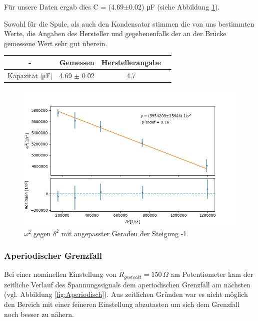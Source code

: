 \documentclass[12pt,a4paper]{article}
\begin{document}
Für unsere Daten ergab dies C = (4.69$\pm$0.02) \si{\micro\farad} (siehe Abbildung \ref{pic:fit_C_RLC}).

Sowohl für die Spule, als auch den Kondensator stimmen die von uns bestimmten Werte, die Angaben des Hersteller und gegebenenfalls der an der Brücke gemessene Wert sehr gut überein.


\begin{table}[H]
	\centering
	\begin{tabular}{|c|c|c|c|}
		\hline
		- & \textbf{Gemessen} & \textbf{Herstellerangabe} \\
		\hline
		Kapazität [\si{\micro\farad}] & 4.69 $\pm$ 0.02 & 4.7 \\
		\hline
	\end{tabular}
\end{table}

\begin{figure}
	\centering
	\includegraphics[width=0.8\linewidth]{Bilder/fit_C_RLC}
	\caption{$\omega^2$ gegen $\delta^2$ mit angepasster Geraden der Steigung -1.}
	\label{pic:fit_C_RLC}
\end{figure}


\subsubsection{Aperiodischer Grenzfall}
Bei einer nominellen Einstellung von $R_{gesteckt}=150\,\Omega$ am Potentiometer kam der zeitliche Verlauf des Spannungssignals dem aperiodischen Grenzfall am nächsten (vgl. Abbildung \ref{fig:Aperiodisch}). Aus zeitlichen Gründen war es nicht möglich den Bereich mit einer feineren Einstellung abzutasten um sich dem Grenzfall noch besser zu nähern.\\
\end{document}
